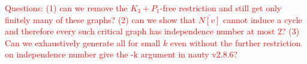 \documentclass[11pt]{article}
\newtheorem{lemma}[theorem]{Lemma}
\theoremstyle{definition}
\newcommand{\noneighbs}{\overline{N[v]}}
\begin{document}
\textcolor{red}{Questions: (1) can we remove the $K_3+P_1$-free restriction and still get only finitely many of these graphs? (2) can we show that $\noneighbs$ cannot induce a cycle and therefore every such critical graph has independence number at most $2$? (3) Can we exhaustively generate all for small $k$ even without the further restriction on independence number give the -k argument in nauty v2.8.6?}

%
%
\end{document}
